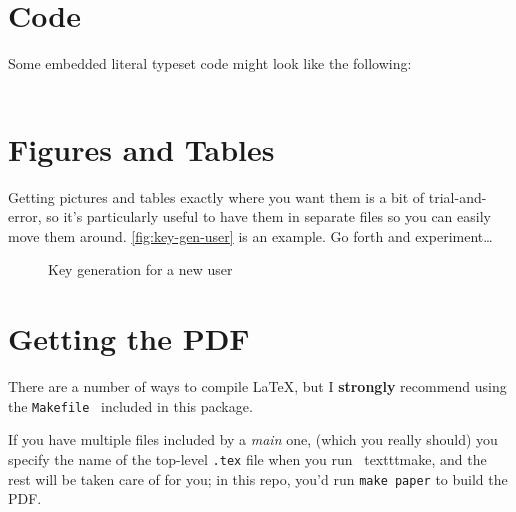 \documentclass[letterpaper,twocolumn,10pt,final]{article}
\begin{document}
\section{\label{sec:code}Code}
Some embedded literal typeset code might look like the following:
\\ %
\texttt{
    \small
}


\section{\label{sec:ft}Figures and Tables}
Getting pictures and tables exactly where you want them is a bit of trial-and-
error, so it's particularly useful to have them in separate files so you can
easily move them around. \autoref{fig:key-gen-user} is an example. Go forth and
experiment\ldots


% 
\begin{figure*}
    \centering
    
    \caption{Key generation for a new user}
    \label{fig:key-gen-user}
\end{figure*}


\section{\label{sec:tex}Getting the PDF}
There are a number of ways to compile LaTeX, but I \textbf{strongly} recommend
using the \texttt{Makefile}~\cite{latex-makefile} included in this package.

If you have multiple files included by a \textit{main} one, (which you really
should) you specify the name of the top-level \texttt{.tex} file when you run \
texttt{make}, and the rest will be taken care of for you; \eg in this repo,
you'd run \texttt{make paper} to build the PDF.

{\footnotesize
    
    
}

\theendnotes
\end{document}
